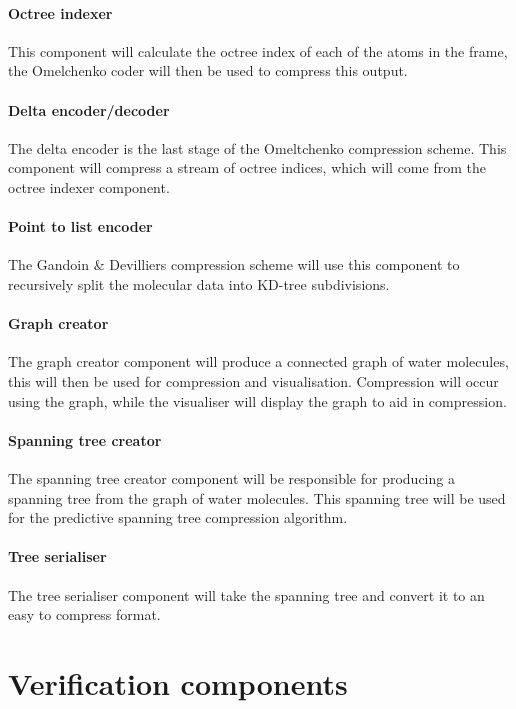 \paragraph{Octree indexer}

This component will calculate the octree index of each of the atoms in the
frame, the Omelchenko coder will then be used to compress this output.


\paragraph{Delta encoder/decoder}

The delta encoder is the last stage of the Omeltchenko compression scheme. This
component will compress a stream of octree indices, which will come from the
octree indexer component.


\paragraph{Point to list encoder}

The Gandoin \& Devilliers compression scheme will use this component to
recursively split the molecular data into KD-tree subdivisions.




\paragraph{Graph creator}

The graph creator component will produce a connected graph of water molecules,
this will then be used for compression and visualisation. Compression will
occur using the graph, while the visualiser will display the graph to aid in
compression.


\paragraph{Spanning tree creator}

The spanning tree creator component will be responsible for producing a
spanning tree from the graph of water molecules. This spanning tree will be
used for the predictive spanning tree compression algorithm.


\paragraph{Tree serialiser}

The tree serialiser component will take the spanning tree and convert it to an
easy to compress format.



\section{Verification components}
\label{sec:verification components}



